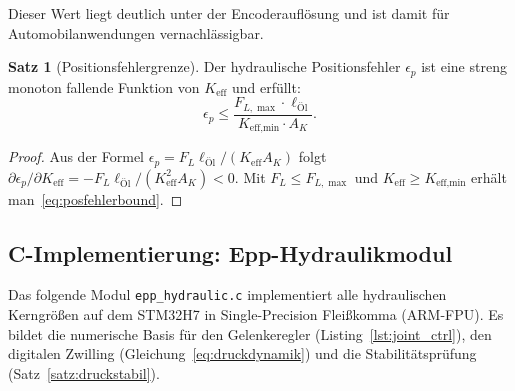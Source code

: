 ﻿\documentclass[a4paper,12pt]{scrreprt}
\theoremstyle{definition}
\newtheorem{satz}{Satz}[section]
\begin{document}
Dieser Wert liegt deutlich unter der Encoderauflösung und ist damit
für Automobilanwendungen vernachlässigbar.

\begin{satz}[Positionsfehlergrenze]
\label{satz:posfehler}
Der hydraulische Positionsfehler $\epsilon_p$ ist eine streng monoton
fallende Funktion von $K_{\text{eff}}$ und erfüllt:
\begin{equation}
  \epsilon_p \leq \frac{F_{L,\max} \cdot \ell_{\text{Öl}}}
                       {K_{\text{eff,min}} \cdot A_K}.
  \label{eq:posfehlerbound}
\end{equation}
\end{satz}

\begin{proof}
Aus der Formel $\epsilon_p = F_L \ell_{\text{Öl}}/(K_{\text{eff}} A_K)$
folgt $\partial\epsilon_p/\partial K_{\text{eff}} = -F_L \ell_{\text{Öl}}/(K_{\text{eff}}^2 A_K) < 0$.
Mit $F_L \leq F_{L,\max}$ und $K_{\text{eff}} \geq K_{\text{eff,min}}$
erhält man~\eqref{eq:posfehlerbound}.
\end{proof}

\subsection{C-Implementierung: Epp-Hydraulikmodul}

Das folgende Modul \texttt{epp\_hydraulic.c} implementiert alle
hyd\-rau\-li\-schen Kerngrößen auf dem STM32H7 in Single-Precision
Fleißkomma (ARM-FPU). Es bildet die numerische Basis für den
Gelenkeregler (Listing~\ref{lst:joint_ctrl}), den digitalen Zwilling
(Gleichung~\ref{eq:druckdynamik}) und die Stabili\-täts\-prüfung
(Satz~\ref{satz:druckstabil}).
\end{document}
